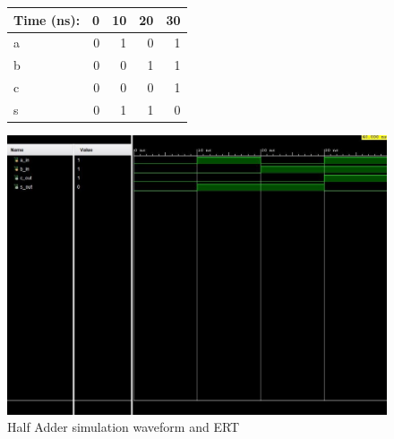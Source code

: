 \documentclass[11pt]{article}
\begin{document}
\begin{figure}[ht]\centering
	\begin{tabular}{l|rrrr}
		Time (ns): & 0 & 10 & 20 & 30 \\
		\midrule 
		a & 0 & 1 & 0 & 1 \\
		b & 0 & 0 & 1 & 1 \\
		\midrule
		c & 0 & 0 & 0 & 1 \\
		s & 0 & 1 & 1 & 0 \\ 
		\bottomrule
	\end{tabular}\medskip
	
	\includegraphics[width=1.0\textwidth]{HalfAdder}
	\caption{Half Adder simulation waveform and ERT}
	\label{fig:sim_with_table}
\end{figure}


\clearpage
\end{document}
